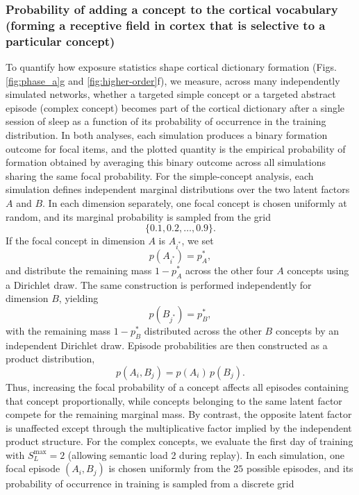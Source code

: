 \documentclass{article}
\begin{document}
\subsubsection*{Probability of adding a concept to the cortical vocabulary (forming a receptive field in cortex that is selective to a particular concept)}
To quantify how exposure statistics shape cortical dictionary formation (Figs. \ref{fig:phase_a}g and \ref{fig:higher-order}f), we measure, across many independently simulated networks, whether a targeted simple concept or a targeted abstract episode (complex concept) becomes part of the cortical dictionary after a single session of sleep as a function of its probability of occurrence in the training distribution. In both analyses, each simulation produces a binary formation outcome for focal items, and the plotted quantity is the empirical probability of formation obtained by averaging this binary outcome across all simulations sharing the same focal probability.
\newline\newline
For the simple-concept analysis, each simulation defines independent marginal distributions over the two latent factors $A$ and $B$. In each dimension separately, one focal concept is chosen uniformly at random, and its marginal probability is sampled from the grid
\[
\{0.1,0.2,\dots,0.9\}.
\]
If the focal concept in dimension $A$ is $A_{i^\ast}$, we set
\[
p(A_{i^\ast}) = p^\ast_A,
\]
and distribute the remaining mass $1-p^\ast_A$ across the other four $A$ concepts using a Dirichlet draw. The same construction is performed independently for dimension $B$, yielding
\[
p(B_{j^\ast}) = p^\ast_B,
\]
with the remaining mass $1-p^\ast_B$ distributed across the other $B$ concepts by an independent Dirichlet draw. Episode probabilities are then constructed as a product distribution,
\[
p(A_i,B_j)=p(A_i)\,p(B_j).
\]
Thus, increasing the focal probability of a concept affects all episodes containing that concept proportionally, while concepts belonging to the same latent factor compete for the remaining marginal mass. By contrast, the opposite latent factor is unaffected except through the multiplicative factor implied by the independent product structure.
\newline\newline
For the complex concepts, we evaluate the first day of training with $S_L^\textrm{max}=2$ (allowing semantic load 2 during replay). In each simulation, one focal episode $(A_i,B_j)$ is chosen uniformly from the $25$ possible episodes, and its probability of occurrence in training is sampled from a discrete grid
\end{document}
